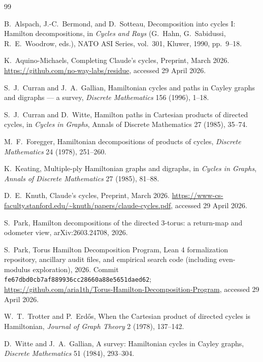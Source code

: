 \documentclass[11pt]{article}
\theoremstyle{definition}
\begin{document}
\begin{thebibliography}{99}

B.~Alspach, J.-C.~Bermond, and D.~Sotteau,
\newblock Decomposition into cycles I: Hamilton decompositions,
\newblock in \emph{Cycles and Rays} (G.~Hahn, G.~Sabidussi, R.~E.~Woodrow, eds.),
NATO ASI Series, vol.~301, Kluwer, 1990, pp.~9--18.

K.~Aquino-Michaels,
\newblock Completing Claude's cycles,
\newblock Preprint, March 2026.
\newblock \url{https://github.com/no-way-labs/residue}, accessed 29 April 2026.

S.~J.~Curran and J.~A.~Gallian,
\newblock Hamiltonian cycles and paths in Cayley graphs and digraphs --- a survey,
\newblock \emph{Discrete Mathematics} 156 (1996), 1--18.

S.~J.~Curran and D.~Witte,
\newblock Hamilton paths in Cartesian products of directed cycles,
\newblock in \emph{Cycles in Graphs}, Annals of Discrete Mathematics 27 (1985), 35--74.

M.~F.~Foregger,
\newblock Hamiltonian decompositions of products of cycles,
\newblock \emph{Discrete Mathematics} 24 (1978), 251--260.

K.~Keating,
\newblock Multiple-ply Hamiltonian graphs and digraphs,
\newblock in \emph{Cycles in Graphs}, \emph{Annals of Discrete Mathematics} 27 (1985), 81--88.

D.~E.~Knuth,
\newblock Claude's cycles,
\newblock Preprint, March 2026.
\newblock \url{https://www-cs-faculty.stanford.edu/~knuth/papers/claude-cycles.pdf}, accessed 29 April 2026.

S.~Park,
\newblock Hamilton decompositions of the directed 3-torus: a return-map and odometer view,
\newblock arXiv:2603.24708, 2026.

S.~Park,
\newblock Torus Hamilton Decomposition Program,
\newblock Lean 4 formalization repository, ancillary audit files, and empirical search code
(including even-modulus exploration), 2026.
\newblock Commit \texttt{fe67dbd0cb7af889936cc28660a88e5651daed62};
\newblock \url{https://github.com/aria1th/Torus-Hamilton-Decomposition-Program}, accessed 29 April 2026.

W.~T.~Trotter and P.~Erd\H{o}s,
\newblock When the Cartesian product of directed cycles is Hamiltonian,
\newblock \emph{Journal of Graph Theory} 2 (1978), 137--142.

D.~Witte and J.~A.~Gallian,
\newblock A survey: Hamiltonian cycles in Cayley graphs,
\newblock \emph{Discrete Mathematics} 51 (1984), 293--304.

\end{thebibliography}
\end{document}
